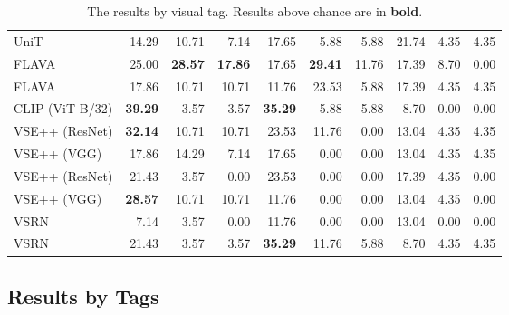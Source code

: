 \documentclass[10pt,twocolumn,letterpaper]{article}
\begin{document}
\begin{table*}
{\begin{tabular}{lrrr|rrr|rrr}
 UniT       & 14.29          & 10.71          & 7.14           & 17.65          & 5.88           & 5.88           & 21.74          & 4.35           & 4.35           \\
 FLAVA                & 25.00          & \textbf{28.57} & \textbf{17.86} & 17.65          & \textbf{29.41} & 11.76 & 17.39          &  8.70 &  0.00 \\
 FLAVA        & 17.86          & 10.71          & 10.71          & 11.76          & 23.53          & 5.88           & 17.39          & 4.35           &  4.35 \\
 CLIP (ViT-B/32)              & \textbf{39.29} & 3.57           & 3.57           & \textbf{35.29} & 5.88           & 5.88           & 8.70           & 0.00           & 0.00           \\
 VSE++ (ResNet)      & \textbf{32.14} & 10.71          & 10.71          & 23.53          & 11.76          & 0.00           & 13.04          & 4.35           & 4.35           \\
 VSE++ (VGG)         & 17.86          & 14.29          & 7.14           & 17.65          & 0.00           & 0.00           & 13.04          & 4.35           & 4.35           \\
 VSE++ (ResNet) & 21.43          & 3.57           & 0.00           & 23.53          & 0.00           & 0.00           & 17.39          & 4.35           & 0.00           \\
 VSE++ (VGG)    & \textbf{28.57} & 10.71          & 10.71          & 11.76          & 0.00           & 0.00           & 13.04          & 4.35           & 0.00           \\
 VSRN                & 7.14           & 3.57           & 0.00           & 11.76          & 0.00           & 0.00           & 13.04          & 0.00           & 0.00           \\
 VSRN           & 21.43          & 3.57           & 3.57           & \textbf{35.29} & 11.76          & 5.88           & 8.70           & 4.35           & 4.35           \\
    \bottomrule
  \end{tabular}
  }
  \caption{The results by visual tag. Results above chance are in \textbf{bold}.}
    \label{tab:results-by-visual-tag}
\end{table*}

\subsection{Results by Tags}
\end{document}
